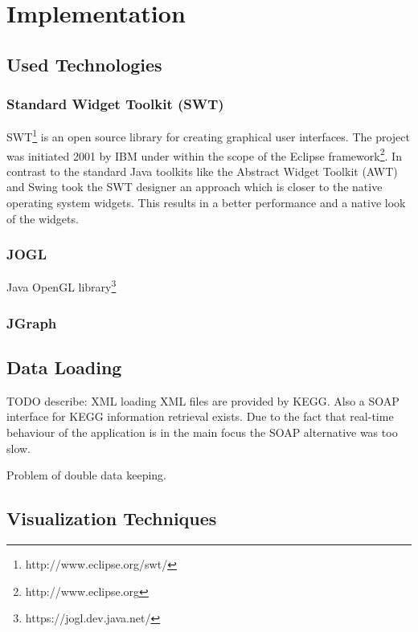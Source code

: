 \chapter{Implementation}

\section{Used Technologies}
\subsection{Standard Widget Toolkit (SWT)}

SWT\footnote{http://www.eclipse.org/swt/} is an open source library for creating graphical user interfaces. The project was initiated 2001 by IBM under within the scope of the Eclipse framework\footnote{http://www.eclipse.org}. In contrast to the standard Java toolkits like the Abstract Widget Toolkit (AWT) and Swing took the SWT designer an approach which is closer to the native operating system widgets. This results in a better performance and a native look of the widgets.

\subsection{JOGL}

Java OpenGL library\footnote{https://jogl.dev.java.net/}

\subsection{JGraph}

\section{Data Loading}

TODO describe:
XML loading
XML files are provided by KEGG.
Also a SOAP interface for KEGG information retrieval exists. Due to the fact that real-time behaviour of the application is in the main focus the SOAP alternative was too slow.

Problem of double data keeping. 

\section{Visualization Techniques}

